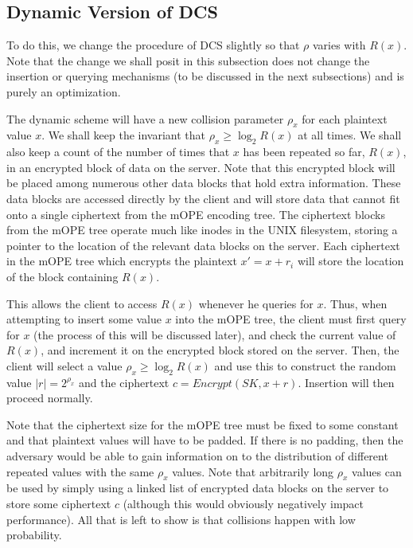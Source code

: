 \documentclass[12pt]{article}
\begin{document}
\subsection{Dynamic Version of DCS}

To do this, we change the procedure of DCS slightly so that $\rho$ varies with $R(x)$. Note that the change we shall posit in this subsection does not change the insertion or querying mechanisms (to be discussed in the next subsections) and is purely an optimization.

The dynamic scheme will have a new collision parameter $\rho_x$ for each plaintext value $x$. We shall keep the invariant that $\rho_x \geq \log_2 R(x)$ at all times. We shall also keep a count of the number of times that $x$ has been repeated so far, $R(x)$, in an encrypted block of data on the server. Note that this encrypted block will be placed among numerous other data blocks that hold extra information. These data blocks are accessed directly by the client and will store data that cannot fit onto a single ciphertext from the mOPE encoding tree. The ciphertext blocks from the mOPE tree operate much like inodes in the UNIX filesystem, storing a pointer to the location of the relevant data blocks on the server. Each ciphertext in the mOPE tree which encrypts the plaintext $x' = x + r_i$ will store the location of the block containing $R(x)$.

This allows the client to access $R(x)$ whenever he queries for $x$. Thus, when attempting to insert some value $x$ into the mOPE tree, the client must first query for $x$ (the process of this will be discussed later), and check the current value of $R(x)$, and increment it on the encrypted block stored on the server. Then, the client will select a value $\rho_x \geq \log_2 R(x)$ and use this to construct the random value $|r| = 2^{\rho_x}$ and the ciphertext $c = Encrypt(SK, x + r)$. Insertion will then proceed normally.

Note that the ciphertext size for the mOPE tree must be fixed to some constant and that plaintext values will have to be padded. If there is no padding, then the adversary would be able to gain information on to the distribution of different repeated values with the same $\rho_x$ values. Note that arbitrarily long $\rho_x$ values can be used by simply using a linked list of encrypted data blocks on the server to store some ciphertext $c$ (although this would obviously negatively impact performance). All that is left to show is that collisions happen with low probability. \\
\end{document}
